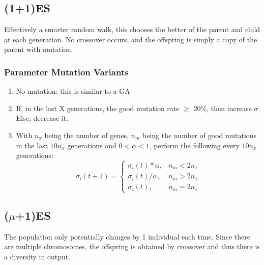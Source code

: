 \subsection{(1+1)ES}
Effectively a smarter random walk, this chooses the better of the parent and child at each generation. No crossover occurs, and the offspring is simply a copy of the parent with mutation.

\subsubsection{Parameter Mutation Variants}
\begin{enumerate}
    \item No mutation: this is similar to a GA
    \item If, in the last X generations, the good mutation rate $\geq$ 20\%, then increase $\sigma$. Else, decrease it.
    \item With $n_x$ being the number of genes, $n_m $ being the number of good mutations in the last $10n_x$ generations and $0<\alpha<1$,  perform the following every $10n_x$ generations:
    \[
    \sigma_i(t+1) = 
    \begin{cases}
        \sigma_i(t) * \alpha, &  n_m < 2n_x\\
        \sigma_i(t) / \alpha, &  n_m > 2n_x\\
        \sigma_i(t),  &  n_m = 2n_x
    \end{cases}
    \]
\end{enumerate}

\subsection{($\mu$+1)ES}
The population only potentially changes by 1 individual each time. Since there are multiple chromosomes, the offspring is obtained by crossover and thus there is a diversity in output. 